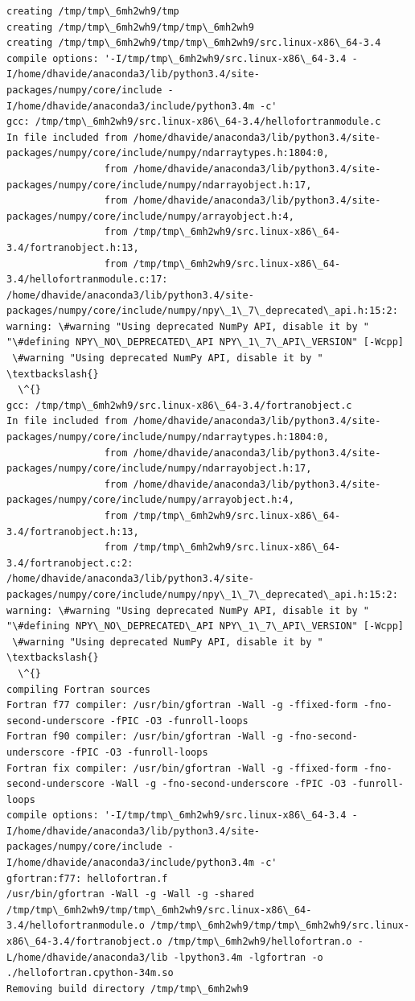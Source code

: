 \documentclass{article}
\begin{document}
\begin{Verbatim}[commandchars=\\\{\}]
creating /tmp/tmp\_6mh2wh9/tmp
creating /tmp/tmp\_6mh2wh9/tmp/tmp\_6mh2wh9
creating /tmp/tmp\_6mh2wh9/tmp/tmp\_6mh2wh9/src.linux-x86\_64-3.4
compile options: '-I/tmp/tmp\_6mh2wh9/src.linux-x86\_64-3.4 -I/home/dhavide/anaconda3/lib/python3.4/site-packages/numpy/core/include -I/home/dhavide/anaconda3/include/python3.4m -c'
gcc: /tmp/tmp\_6mh2wh9/src.linux-x86\_64-3.4/hellofortranmodule.c
In file included from /home/dhavide/anaconda3/lib/python3.4/site-packages/numpy/core/include/numpy/ndarraytypes.h:1804:0,
                 from /home/dhavide/anaconda3/lib/python3.4/site-packages/numpy/core/include/numpy/ndarrayobject.h:17,
                 from /home/dhavide/anaconda3/lib/python3.4/site-packages/numpy/core/include/numpy/arrayobject.h:4,
                 from /tmp/tmp\_6mh2wh9/src.linux-x86\_64-3.4/fortranobject.h:13,
                 from /tmp/tmp\_6mh2wh9/src.linux-x86\_64-3.4/hellofortranmodule.c:17:
/home/dhavide/anaconda3/lib/python3.4/site-packages/numpy/core/include/numpy/npy\_1\_7\_deprecated\_api.h:15:2: warning: \#warning "Using deprecated NumPy API, disable it by " "\#defining NPY\_NO\_DEPRECATED\_API NPY\_1\_7\_API\_VERSION" [-Wcpp]
 \#warning "Using deprecated NumPy API, disable it by " \textbackslash{}
  \^{}
gcc: /tmp/tmp\_6mh2wh9/src.linux-x86\_64-3.4/fortranobject.c
In file included from /home/dhavide/anaconda3/lib/python3.4/site-packages/numpy/core/include/numpy/ndarraytypes.h:1804:0,
                 from /home/dhavide/anaconda3/lib/python3.4/site-packages/numpy/core/include/numpy/ndarrayobject.h:17,
                 from /home/dhavide/anaconda3/lib/python3.4/site-packages/numpy/core/include/numpy/arrayobject.h:4,
                 from /tmp/tmp\_6mh2wh9/src.linux-x86\_64-3.4/fortranobject.h:13,
                 from /tmp/tmp\_6mh2wh9/src.linux-x86\_64-3.4/fortranobject.c:2:
/home/dhavide/anaconda3/lib/python3.4/site-packages/numpy/core/include/numpy/npy\_1\_7\_deprecated\_api.h:15:2: warning: \#warning "Using deprecated NumPy API, disable it by " "\#defining NPY\_NO\_DEPRECATED\_API NPY\_1\_7\_API\_VERSION" [-Wcpp]
 \#warning "Using deprecated NumPy API, disable it by " \textbackslash{}
  \^{}
compiling Fortran sources
Fortran f77 compiler: /usr/bin/gfortran -Wall -g -ffixed-form -fno-second-underscore -fPIC -O3 -funroll-loops
Fortran f90 compiler: /usr/bin/gfortran -Wall -g -fno-second-underscore -fPIC -O3 -funroll-loops
Fortran fix compiler: /usr/bin/gfortran -Wall -g -ffixed-form -fno-second-underscore -Wall -g -fno-second-underscore -fPIC -O3 -funroll-loops
compile options: '-I/tmp/tmp\_6mh2wh9/src.linux-x86\_64-3.4 -I/home/dhavide/anaconda3/lib/python3.4/site-packages/numpy/core/include -I/home/dhavide/anaconda3/include/python3.4m -c'
gfortran:f77: hellofortran.f
/usr/bin/gfortran -Wall -g -Wall -g -shared /tmp/tmp\_6mh2wh9/tmp/tmp\_6mh2wh9/src.linux-x86\_64-3.4/hellofortranmodule.o /tmp/tmp\_6mh2wh9/tmp/tmp\_6mh2wh9/src.linux-x86\_64-3.4/fortranobject.o /tmp/tmp\_6mh2wh9/hellofortran.o -L/home/dhavide/anaconda3/lib -lpython3.4m -lgfortran -o ./hellofortran.cpython-34m.so
Removing build directory /tmp/tmp\_6mh2wh9
    \end{Verbatim}
\end{document}
